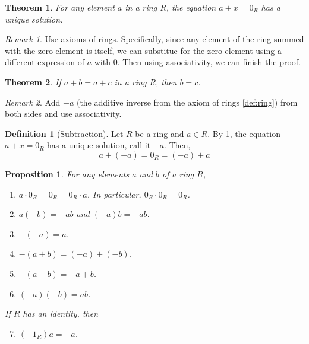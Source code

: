 \documentclass{article}
\newtheorem{theorem}{Theorem}[section]
\newtheorem{proposition}{Proposition}[section]
\theoremstyle{definition}
\newtheorem{definition}{Definition}[section]
\theoremstyle{remark}
\newtheorem{remark}{Remark}[section]
\begin{document}
\begin{theorem} \label{thm:uniqueness of additive inverse}
For any element $a$ in a ring $R$, the equation $a + x = 0_R$ has a unique solution.
\end{theorem}
\begin{remark}
Use axioms of rings. Specifically, since any element of the ring summed with 
the zero element is itself, we can substitue for the zero element using 
a different expression of $a$ with 0. Then using associativity, we can finish the proof.
\end{remark}



\begin{theorem}\label{thm:subtraction}
If $a + b = a + c$ in a ring $R$, then $b = c$.
\end{theorem}
\begin{remark}
Add $-a$ (the additive inverse from the axiom of rings \ref{def:ring}) from both sides and use associativity.
\end{remark}

\begin{definition}[Subtraction]
Let $R$ be a ring and $a \in R$. By \ref{thm:uniqueness of additive inverse}, the equation
$a+x = 0_R$ has a unique solution, call it $-a$. Then, \[
a+(-a)=0_R = (-a)+a
\]
\end{definition}



\begin{proposition} \label{prp:ring arithmetic with subtraction}
For any elements $a$ and $b$ of a ring $R$,
\begin{enumerate}
\item $a \cdot 0_R = 0_R = 0_R \cdot a$. In particular, $0_R \cdot 0_R = 0_R$.
\item $a(-b) = -ab$ \quad and \quad $(-a)b = -ab$.
\item $-(-a) = a$.
\item $-(a + b) = (-a) + (-b)$.
\item $-(a - b) = -a + b$.
\item $(-a)(-b) = ab$.
\end{enumerate}
If $R$ has an identity, then
\begin{enumerate}
\setcounter{enumi}{6}
\item $(-1_R)a = -a$.
\end{enumerate}
\end{proposition}
\end{document}
